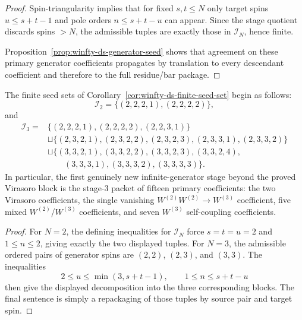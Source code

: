 \begin{proof}
Spin-triangularity implies that for fixed $s,t \le N$ only target spins
$u \le s+t-1$ and pole orders $n \le s+t-u$ can appear. Since the
stage quotient discards spins $>N$, the admissible tuples are exactly
those in $\mathcal{I}_N$, hence finite.

Proposition~\ref{prop:winfty-ds-generator-seed} shows that agreement on
these primary generator coefficients propagates by translation to every
descendant coefficient and therefore to the full residue/bar package.
\end{proof}

\begin{corollary}
\label{cor:winfty-ds-lowstage-seeds}
The finite seed sets of
Corollary~\ref{cor:winfty-ds-finite-seed-set} begin as follows:
\[
\mathcal{I}_2
=\{(2,2,2,1),(2,2,2,2)\},
\]
and
\begin{align*}
\mathcal{I}_3
= {} & \{(2,2,2,1),(2,2,2,2),(2,2,3,1)\} \\
& \sqcup\{(2,3,2,1),(2,3,2,2),(2,3,2,3),(2,3,3,1),(2,3,3,2)\} \\
& \sqcup\{(3,3,2,1),(3,3,2,2),(3,3,2,3),(3,3,2,4), \\
& \qquad (3,3,3,1),(3,3,3,2),(3,3,3,3)\}.
\end{align*}
In particular, the first genuinely new infinite-generator stage beyond
the proved Virasoro block is the stage-$3$ packet of fifteen
primary coefficients: the two Virasoro coefficients, the single
vanishing $W^{(2)}W^{(2)}\to W^{(3)}$ coefficient, five mixed
$W^{(2)}$/$W^{(3)}$ coefficients, and seven $W^{(3)}$ self-coupling
coefficients.
\end{corollary}

\begin{proof}
For $N=2$, the defining inequalities for $\mathcal{I}_N$ force
$s=t=u=2$ and $1\le n\le 2$, giving exactly the two displayed tuples.
For $N=3$, the admissible ordered pairs of generator spins are
$(2,2)$, $(2,3)$, and $(3,3)$. The inequalities
\[
2\le u\le \min(3,s+t-1),
\qquad
1\le n\le s+t-u
\]
then give the displayed decomposition into the three corresponding
blocks. The final sentence is simply a repackaging of those tuples by
source pair and target spin.
\end{proof}

